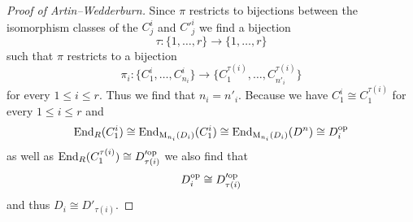 \begin{proof}[Proof of Artin--Wedderburn]
  Since $\pi$ restricts to bijections between the isomorphism classes of the $C^i_j$ and $C'^i_j$ we find a bijection
  \[
            \tau
    \colon  \{1, \dotsc, r\}
    \to     \{1, \dotsc, r\}
  \]
  such that $\pi$ restricts to a bijection
  \[
            \pi_i
    \colon  \{ C^i_1, \dotsc, C^i_{n_i} \}
    \to     \{ C^{\tau(i)}_1, \dotsc, C^{\tau(i)}_{n'_i} \}
  \]
  for every $1 \leq i \leq r$.
  Thus we find that $n_i = n'_i$.
  Because we have $C^i_1 \cong C^{\tau(i)}_1$ for every $1 \leq i \leq r$ and
  \[
          \operatorname{End}_R(C^i_1)
    \cong \operatorname{End}_{\operatorname{M}_{n_i}(D_i)}(C^i_1)
    \cong \operatorname{End}_{\operatorname{M}_{n_i}(D_i)}(D^n)
    \cong D_i^{\mathrm{op}}
  \]
  as well as $\operatorname{End}_R(C^{\tau(i)}_1) \cong D_{\tau(i)}'^{\mathrm{op}}$ we also find that
  \[
          D_i^{\mathrm{op}}
    \cong D_{\tau(i)}'^{\mathrm{op}}
  \]
  and thus $D_i \cong D'_{\tau(i)}$.
\end{proof}




